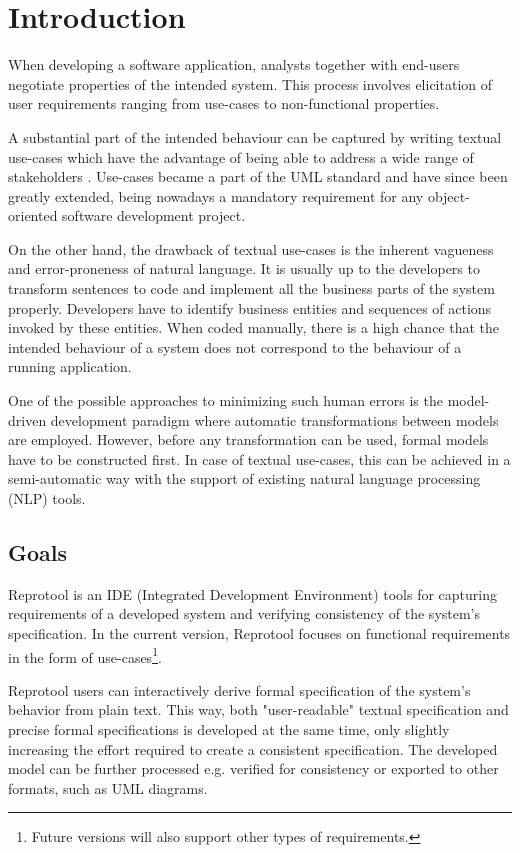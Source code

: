 \section{Introduction}

When developing a software application, analysts together with end-users negotiate properties of the intended system. This process involves elicitation of user requirements ranging from use-cases to non-functional properties.

A substantial part of the intended behaviour can be captured by writing textual use-cases which have the advantage of being able to address a wide range of stakeholders \cite{Larman,Cockburn:2000:WEU:517669}. Use-cases became a part of the UML standard \cite{UML-standard} and have since been greatly extended, being nowadays a mandatory requirement for any object-oriented software development project.

On the other hand, the drawback of textual use-cases is the inherent vagueness and error-proneness of natural language. It is usually up to the developers to transform sentences to code and implement all the business parts of the system properly. Developers have to identify business entities and sequences of actions invoked by these entities. When coded manually, there is a high chance that the intended behaviour of a system does not correspond to the behaviour of a running application.

One of the possible approaches to minimizing such human errors is the model-driven development paradigm \cite{MDD} where automatic transformations between models are employed. However, before any transformation can be used, formal models have to be constructed first. In case of textual use-cases, this can be achieved in a semi-automatic way with the support of existing natural language processing (NLP) tools.

\subsection{Goals}
Reprotool is an IDE (Integrated Development Environment) tools for capturing requirements of a developed system and verifying consistency of the system's specification.
In the current version, Reprotool focuses on functional requirements in the form of use-cases\footnote{Future versions will also support other types of requirements.}.

Reprotool users can interactively derive formal specification of the system's behavior from plain text. This way, both "user-readable" textual specification and precise formal specifications is developed at the same time, only slightly increasing the effort required to create a consistent specification. The developed model can be further processed e.g. verified for consistency or exported to other formats, such as UML diagrams.

